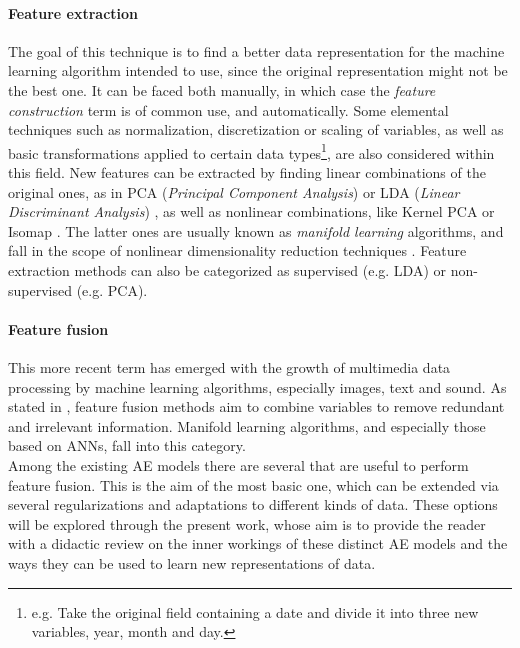     \paragraph{Feature extraction } 
    The goal of this technique is to find a better data representation for the machine learning algorithm intended to use, since the original representation might not be the best one. It can be faced both manually, in which case the \textit{feature construction} term is of common use, and automatically. Some elemental techniques such as normalization, discretization or scaling of variables, as well as basic transformations applied to certain data types\footnote{e.g. Take the original field containing a date and divide it into three new variables, year, month and day.}, are also considered within this field. New features can be extracted by finding linear combinations of the original ones, as in PCA (\textit{Principal Component Analysis})  or LDA (\textit{Linear Discriminant Analysis}) , as well as nonlinear combinations, like Kernel PCA   or Isomap . The latter ones are usually known as \textit{manifold learning}  algorithms, and fall in the scope of nonlinear dimensionality reduction techniques . Feature extraction methods can also be categorized as supervised (e.g. LDA) or non-supervised (e.g. PCA).
    
    \paragraph{Feature fusion }
    This more recent term has emerged with the growth of multimedia data processing by machine learning algorithms, especially images, text and sound. As stated in , feature fusion methods aim to combine variables to remove redundant and irrelevant information. Manifold learning algorithms, and especially those based on ANNs, fall into this category. \\

    Among the existing AE models there are several that are useful to perform feature fusion. This is the aim of the most basic one, which can be extended via several regularizations and adaptations to different kinds of data. These options will be explored through the present work, whose aim is to provide the reader with a didactic review on the inner workings of these distinct AE models and the ways they can be used to learn new representations of data.

